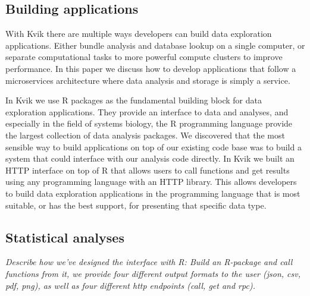


\subsection*{Building applications} 

With Kvik there are multiple ways developers can build data
exploration applications. Either bundle analysis and database lookup on a single
computer, or separate computational tasks to more powerful compute clusters to
improve performance. 
In this paper we discuss how to develop applications that follow a
microservices architecture where data analysis and storage is simply a service. 

In Kvik we use R packages as the fundamental building block for data exploration
applications. They provide an interface to data and analyses, and especially in
the field of systems biology, the R programming language provide the largest
collection of data analysis packages. %
We discovered that the most sensible way to build applications on top of our
existing code base was to build a system that could interface with our analysis
code directly. In Kvik we built an HTTP interface on top of R that allows users
to call functions and get results using any programming language with an HTTP
library. This allows developers to build data exploration applications in the
programming language that is most suitable, or has the best support, for
presenting that specific data type. 

\subsection*{Statistical analyses}
\emph{Describe how we've designed the interface with R: Build an R-package and
call functions from it, we provide four different output formats to the user
(json, csv, pdf, png),  as well as four different http endpoints (call, get and
rpc).}

